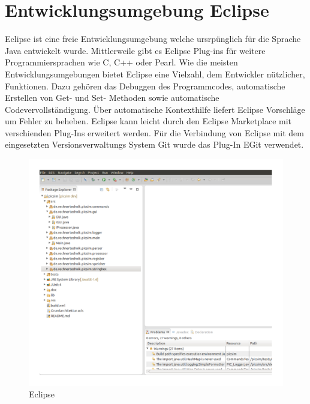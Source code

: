 \section{Entwicklungsumgebung Eclipse}

Eclipse ist eine freie Entwicklungsumgebung welche ursrp\"unglich f\"ur die Sprache Java entwickelt wurde. Mittlerweile gibt es Eclipse Plug-ins f\"ur weitere Programmiersprachen wie C, C++ oder Pearl.
Wie die meisten Entwicklungsumgebungen bietet Eclipse eine Vielzahl, dem Entwickler n\"utzlicher, Funktionen. Dazu geh\"oren das Debuggen des Programmcodes, automatische Erstellen von Get- und Set- Methoden sowie automatische Codevervollst\"andigung. \"Uber automatische Kontexthilfe liefert Eclipse Vorschl\"age um Fehler zu beheben.
Eclipse kann leicht durch den Eclipse Marketplace mit verschienden Plug-Ins erweitert werden. F\"ur die Verbindung von Eclipse mit dem eingesetzten Versionsverwaltungs System Git wurde das Plug-In EGit verwendet.


\begin{figure}[h]
\centering
\includegraphics[scale=0.25]{Bilder/Eclipse.pdf}
\caption{Eclipse}
\end{figure}